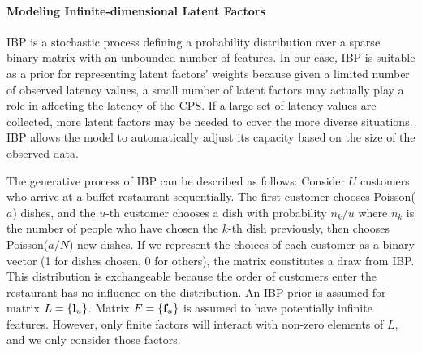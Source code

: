 \documentclass[11pt]{proposalnsf}
\newlength\q %
\begin{document}
\begin{sloppypar}
\vspace{-2mm}\paragraph{Modeling Infinite-dimensional Latent Factors} IBP is a stochastic process defining a probability distribution over a sparse binary matrix with an unbounded number of features. In our case, IBP is suitable as a prior for representing latent factors' weights because given a limited number of observed latency values, a small number of latent factors may actually play a role in affecting the latency of the CPS. If a large set of latency values are collected, more latent factors may be needed to cover the more diverse situations. IBP allows the model to automatically adjust its capacity based on the size of the observed data. 

The generative process of IBP can be described as follows: Consider $U$ customers who arrive at a buffet restaurant sequentially. The first customer chooses Poisson($a$) dishes, and the $u$-th customer chooses a dish with probability $n_k/u$ where $n_k$ is the number of people who have chosen the $k$-th dish previously, then chooses Poisson($a/N$) new dishes. If we represent the choices of each customer as a binary vector (1 for dishes chosen, 0 for others), the matrix constitutes a draw from IBP. This distribution is exchangeable because the order of customers enter the restaurant has no influence on the distribution. An IBP prior is assumed for matrix $L=\{ {\bf l}_u \}$. Matrix $F=\{{\bf f}_u \}$ is assumed to have potentially infinite features. However, only finite factors will interact with non-zero elements of $L$, and we only consider those factors.


\end{sloppypar}
\end{document}
